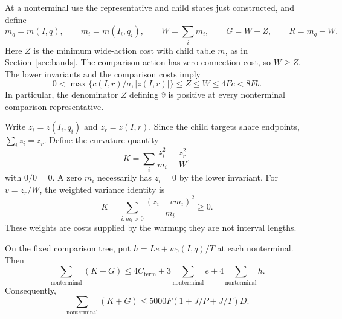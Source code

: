 At a nonterminal use the representative and child states just constructed,
and define
\[
 m_q=m(I,q),\qquad m_i=m(I_i,q_i),\qquad W=\sum_i m_i,
 \qquad G=W-Z,\qquad R=m_q-W.
\]
Here $Z$ is the minimum wide-action cost with child table $m$, as in
Section~\ref{sec:bands}.  The comparison action has zero connection cost,
so $W\ge Z$.  The lower invariants and the comparison costs imply
\begin{equation}\label{eq:comparison-masses}
 0<\max\{c(I,r)/a,|z(I,r)|\}\le Z\le W\le4Fc<8Fb.
\end{equation}
In particular, the denominator $Z$ defining $\widehat v$ is positive at
every nonterminal comparison representative.

Write $z_i=z(I_i,q_i)$ and $z_r=z(I,r)$.  Since the child targets share
endpoints, $\sum_i z_i=z_r$.  Define the curvature quantity
\begin{equation}\label{eq:curvature-definition}
 K=\sum_i\frac{z_i^2}{m_i}-\frac{z_r^2}{W},
\end{equation}
with $0/0=0$.  A zero $m_i$ necessarily has $z_i=0$ by the lower invariant.
For $v=z_r/W$, the weighted variance identity is
\begin{equation}\label{eq:weighted-variance}
 K=\sum_{i:m_i>0}\frac{(z_i-vm_i)^2}{m_i}\ge0.
\end{equation}
These weights are costs supplied by the warmup; they are not interval
lengths.

\begin{lemma}\label{lem:curvature-telescope}
On the fixed comparison tree, put $h=Le+w_0(I,q)/T$ at each nonterminal.
Then
\begin{equation}\label{eq:curvature-structural}
 \sum_{\mathrm{nonterminal}}(K+G)
 \le4C_{\mathrm{term}}+3\sum_{\mathrm{nonterminal}}e
                       +4\sum_{\mathrm{nonterminal}}h.
\end{equation}
Consequently,
\begin{equation}\label{eq:curvature-total}
 \sum_{\mathrm{nonterminal}}(K+G)
 \le5000F(1+J/P+J/T)D.
\end{equation}
\end{lemma}

